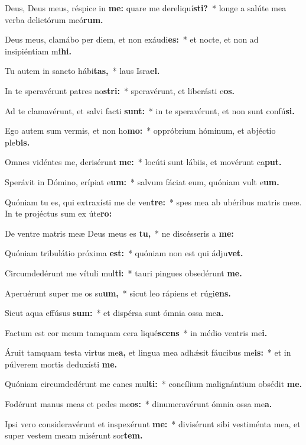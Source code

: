 \item Deus, Deus meus, réspice in \textbf{me:} quare me dereliquí\textbf{sti?}~* longe a salúte mea verba deli\-ctórum meó\textbf{rum.}
\item Deus meus, clamábo per diem, et non exáudi\textbf{es:}~* et nocte, et non ad insipiéntiam m\textbf{ihi.}
\item Tu autem in sancto hábi\textbf{tas,}~* laus Isra\textbf{el.}
\item In te speravérunt patres no\textbf{stri:}~* speravérunt, et liberásti e\textbf{os.}
\item Ad te clamavérunt, et salvi facti \textbf{sunt:}~* in te speravérunt, et non sunt confú\textbf{si.}
\item Ego autem sum vermis, et non ho\textbf{mo:}~* oppróbrium hóminum, et abjéctio ple\textbf{bis.}
\item Omnes vidéntes me, derisérunt \textbf{me:}~* locúti sunt lábiis, et movérunt ca\textbf{put.}
\item Sperávit in Dómino, erípiat e\textbf{um:}~* salvum fáciat eum, quóniam vult e\textbf{um.}
\item Quóniam tu es, qui extraxísti me de ven\textbf{tre:}~* spes mea ab ubéribus matris meæ. In te projé\-ctus sum ex úte\textbf{ro:}
\item De ventre matris meæ Deus meus es \textbf{tu,}~* ne discésseris a \textbf{me:}
\item Quóniam tribulátio próxima \textbf{est:}~* quóniam non est qui ádju\textbf{vet.}
\item Circumdedérunt me vítuli mul\textbf{ti:}~* tauri pingues obsedérunt \textbf{me.}
\item Aperuérunt super me os su\textbf{um,}~* sicut leo rápiens et rúgi\textbf{ens.}
\item Sicut aqua effúsus \textbf{sum:}~* et dispérsa sunt ómnia ossa me\textbf{a.}
\item Factum est cor meum tamquam cera liqué\textbf{scens}~* in médio ventris me\textbf{i.}
\item Áruit tamquam testa virtus me\textbf{a,} et lingua mea adhǽsit fáucibus me\textbf{is:}~* et in púlverem mortis deduxísti \textbf{me.}
\item Quóniam circumdedérunt me canes mul\textbf{ti:}~* concílium malignántium obsédit \textbf{me.}
\item Fodérunt manus meas et pedes me\textbf{os:}~* dinumeravérunt ómnia ossa me\textbf{a.}
\item Ipsi vero consideravérunt et inspexérunt \textbf{me:}~* divisérunt sibi vestiménta mea, et super vestem meam misérunt sor\textbf{tem.}
